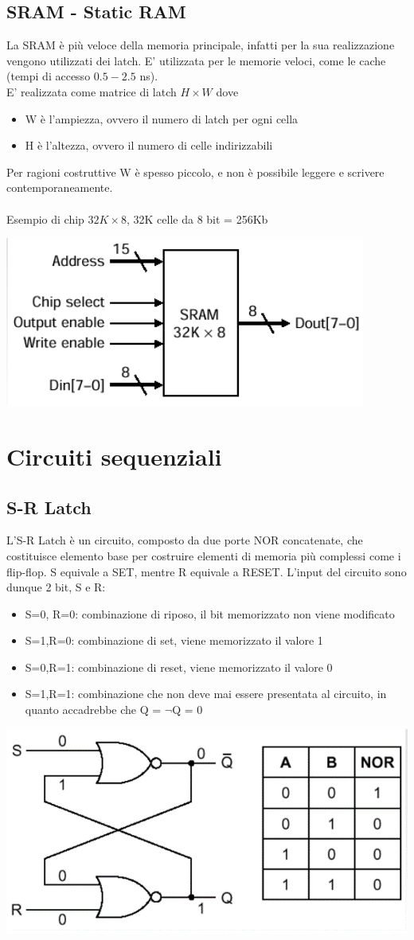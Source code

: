 \documentclass[italian]{article}
\begin{document}
	\subsection{SRAM - Static RAM}
	La SRAM è più veloce della memoria principale, infatti per la sua realizzazione vengono utilizzati dei latch. E' utilizzata per le memorie veloci, come le cache (tempi di accesso $0.5 - 2.5$ ns). \\[2mm]
	E' realizzata come matrice di latch $H\times W$ dove
	\begin{itemize}[noitemsep]
		\item W è l'ampiezza, ovvero il numero di latch per ogni cella
		\item H è l'altezza, ovvero il numero di celle indirizzabili
	\end{itemize}
	Per ragioni costruttive W è spesso piccolo, e non è possibile leggere e scrivere contemporaneamente.\\\\
	Esempio di chip $32K\times8$, 32K celle da 8 bit = 256Kb
	\begin{center}
		\includegraphics[width=0.3\linewidth]{slides/sram}
	\end{center}

	
	\newpage
	\section{Circuiti sequenziali}
	\subsection{S-R Latch}
	L’S-R Latch è un circuito, composto da due porte NOR concatenate, che costituisce elemento base per costruire elementi di memoria più complessi come i flip-flop. S equivale a SET, mentre R equivale a RESET. L’input del circuito sono dunque 2 bit, S e R:
	\begin{itemize}[noitemsep]
		\item S=0, R=0: combinazione di riposo, il bit memorizzato non viene modificato
		\item S=1,R=0: combinazione di set, viene memorizzato il valore 1
		\item S=0,R=1: combinazione di reset, viene memorizzato il valore 0
		\item S=1,R=1: combinazione che non deve mai essere presentata al circuito, in quanto accadrebbe che Q = $\lnot$Q = 0
	\end{itemize}
	\begin{center}
		\includegraphics[width=0.4\linewidth]{slides/latch.png}
	\end{center}
	
\end{document}
